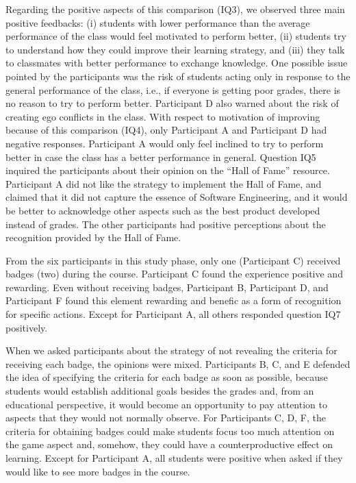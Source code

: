 Regarding the positive aspects of this comparison (IQ3), we observed three main positive feedbacks: (i) students with lower performance than the average performance of the class would feel motivated to perform better, (ii) students try to understand how they could improve their learning strategy, and (iii) they talk to classmates with better performance to exchange knowledge. One possible issue pointed by the participants was the risk of students acting only in response to the general performance of the class, i.e., if everyone is getting poor grades, there is no reason to try to perform better. Participant D also warned about the risk of creating ego conflicts in the class. With respect to motivation of improving because of this comparison (IQ4), only Participant A and Participant D had negative responses. Participant A would only feel inclined to try to perform better in case the class has a better performance in general.
Question IQ5 inquired the participants about their opinion on the “Hall of Fame” resource. Participant A did not like the strategy to implement the Hall of Fame, and claimed that it did not capture the essence of Software Engineering, and it would be better to acknowledge other aspects such as the best product developed instead of grades. The other participants had positive perceptions about the recognition provided by the Hall of Fame.

From the six participants in this study phase, only one (Participant C) received badges (two) during the course. Participant C found the experience positive and rewarding. Even without receiving badges, Participant B, Participant D, and Participant F found this element rewarding and benefic as a form of recognition for specific actions. Except for Participant A, all others responded question IQ7 positively.

When we asked participants about the strategy of not revealing the criteria for receiving each badge, the opinions were mixed. Participants B, C, and E defended the idea of specifying the criteria for each badge as soon as possible, because students would establish additional goals besides the grades and, from an educational perspective, it would become an opportunity to pay attention to aspects that they would not normally observe. For Participants C, D, F, the criteria for obtaining badges could make students focus too much attention on the game aspect and, somehow, they could have a counterproductive effect on learning. Except for Participant A, all students were positive when asked if they would like to see more badges in the course.

